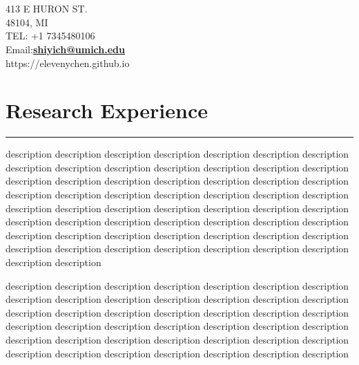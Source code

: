 \documentclass[]{rahulworld-resume}
\begin{document}
\begin{minipage}[t]{0.66\textwidth} 
\hspace*{0pt}\hfill    \\
\hspace*{0pt}\hfill    \\
\hspace*{0pt}\hfill 413 E HURON ST.\\
\hspace*{0pt}\hfill 48104, MI \\
\hspace*{0pt}\hfill TEL: +1 7345480106 \\
\hspace*{0pt}\hfill Email:\textbf{\href{mailto:shiyich@umich.edu}{shiyich@umich.edu}} \\
\hspace*{0pt}\hfill https://elevenychen.github.io

\section{Research Experience}
\noindent\rule{12.5cm}{0.4pt}

 
\noindent
\hspace{5em}%
\begin{minipage}{0.85\textwidth\vspace{2pt}}
description description description description description description description description description description description description description description description description description description description description description description description description description description description description description description description description description description description description description description description description description description description description description description description description description description description description description description description description description description 
\end{minipage}
\sectionsep

 
\noindent
\hspace{5em}%
\begin{minipage}{0.85\textwidth\vspace{2pt}}
description description description description description description description description description description description description description description description description description description description description description description description description description description description description description description description description description description description description description description description description description description 
\end{minipage}
\sectionsep


\end{minipage}
\end{document}
